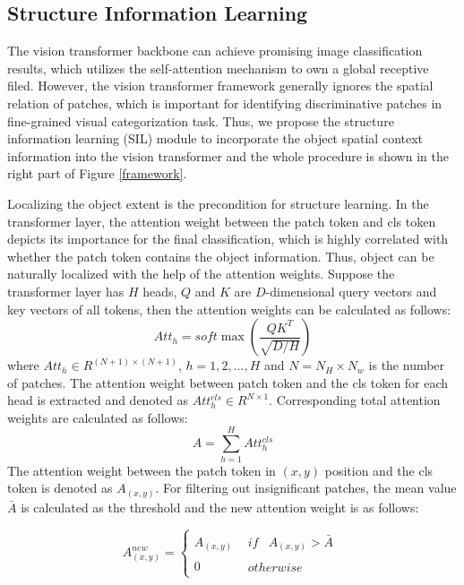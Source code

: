 \documentclass[sigconf, nonacm]{acmart}
\begin{document}
\subsection{Structure Information Learning}\label{SIL}

The vision transformer backbone can achieve promising image classification results, which utilizes the self-attention mechanism to own a global receptive filed. However, the vision transformer framework generally ignores the spatial relation of patches, which is important for identifying discriminative patches in fine-grained visual categorization task. Thus, we propose the structure information learning (SIL) module to incorporate the object spatial context information into the vision transformer and the whole procedure is shown in the right part of Figure \ref{framework}.

Localizing the object extent is the precondition for structure learning. In the transformer layer, the attention weight between the patch token and cls token depicts its importance for the final classification, which is highly correlated with whether the patch token contains the object information. Thus, object can be naturally localized with the help of the attention weights. Suppose the transformer layer has $H$ heads, $Q$ and $K$ are $D$-dimensional query vectors and key vectors of all tokens, then the attention weights can be calculated as follows:
\begin{equation}
At{t_h} = soft\max (\frac{{Q{K^T}}}{{\sqrt {D/H} }})
\end{equation}
where $At{t_h} \in {R^{(N + 1) \times (N + 1)}}$, $h = 1,2,...,H$ and $N = {N_H} \times {N_w}$ is the number of patches. The attention weight between patch token and the cls token for each head is extracted and denoted as $Att_h^{cls} \in {R^{N \times 1}}$. Corresponding total attention weights are calculated as follows:
\begin{equation}
A = \sum\limits_{h = 1}^H {Att_h^{cls}}
\end{equation}
The attention weight between the patch token in $(x,y)$ position and the cls token is denoted as ${A_{(x,y)}}$. For filtering out insignificant patches, the mean value ${\bar A}$ is calculated as the threshold and the new attention weight is as follows:


\begin{equation}
A_{(x,y)}^{new} = \left\{ {\begin{array}{*{20}{c}}
{{A_{(x,y)}}}&{\begin{array}{*{20}{c}}
{if}&{{A_{(x,y)}} > \bar A}
\end{array}}\\
0&{\begin{array}{*{20}{c}}
{otherwise}&{}
\end{array}}
\end{array}} \right.
\end{equation}
\end{document}
